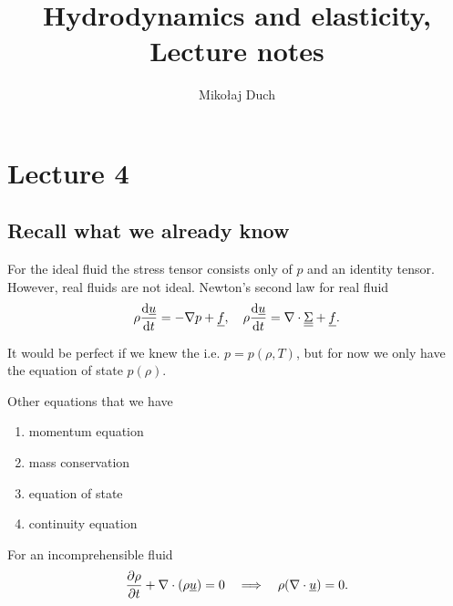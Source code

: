 \documentclass[11pt,oneside]{book}
\title{Hydrodynamics and elasticity,\\ Lecture notes}
\author{Mikołaj Duch}
\renewcommand{\vec}[1]{\underline{#1}}
\theoremstyle{definition} %
\theoremstyle{plain} %
\theoremstyle{remark} %
\theoremstyle{underline}
\begin{document}
  \maketitle
  \frontmatter


  \tableofcontents


  \mainmatter

  
  
  
  
  \chapter{Lecture 4}
  \section{Recall what we already know}
  For the ideal fluid the stress tensor consists only of $p$ and an identity tensor.
  However, real fluids are not ideal. 
  Newton's second law for real fluid
  \begin{displaymath}
    \rho \dfrac{\vec u}{t} = - \nabla p + \vec f, \quad \rho \dfrac{\vec u}{t} = \div \ten \Sigma + \vec f.
  \end{displaymath}

  It would be perfect if we knew the  i.e. $p = p(\rho, T)$, 
  but for now we only have the equation of state $p(\rho)$.

  Other equations that we have
  \begin{enumerate}
    \item momentum equation
    \item mass conservation
    \item equation of state
    \item continuity equation
  \end{enumerate}
  
  For an incomprehensible fluid
  \begin{displaymath}
    \ptf{\rho}{t} + \nabla \cdot(\rho \vec u) = 0 \qLRa \rho (\nabla \cdot \vec u) = 0.
  \end{displaymath}
  
\end{document}
